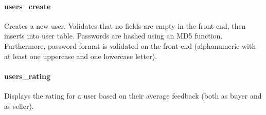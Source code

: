 \paragraph{users\_create}\label{usersux5fcreate}

Creates a new user. Validates that no fields are empty in the front end,
then inserts into user table. Passwords are hashed using an MD5
function. Furthermore, password format is validated on the front-end
(alphanumeric with at least one uppercase and one lowercase letter).

\begin{Shaded}
\begin{Highlighting}[]
 
 \NormalTok{(}\NormalTok{),}
 \NormalTok{(}\NormalTok{),}
 \NormalTok{(}\NormalTok{),}
 \NormalTok{(}\NormalTok{),}
 \NormalTok{(}\NormalTok{)}
\NormalTok{)}
      
     
\end{Highlighting}
\end{Shaded}

\paragraph{users\_rating}\label{usersux5frating}

Displays the rating for a user based on their average feedback (both as
buyer and as seller).

